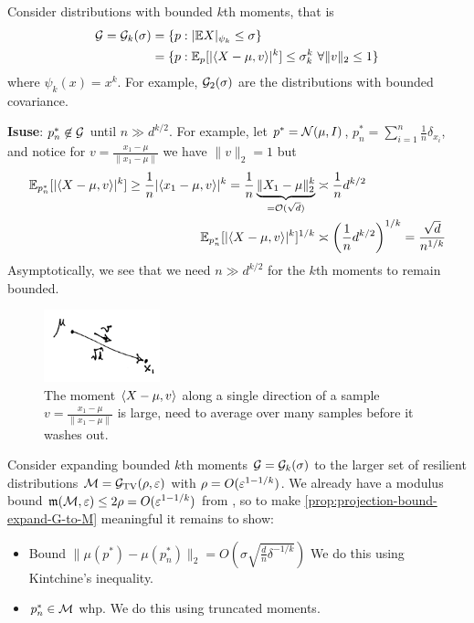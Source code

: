 \begin{example}
  Consider distributions with bounded $k$th moments, that is
  \begin{align}
    \mathcal{G} = \mathcal{G}_k(\sigma)
    &= \{ p : \lvert \mathbb{E} X \rvert_{\psi_k} \leq \sigma \} \\
    &= \{ p : \mathbb{E}_p[ \lvert \braket{X - \mu, v} \rvert^k] \leq \sigma_k^k~\forall \|v\|_2 \leq 1\}
  \end{align}
  where $\psi_k(x) = x^k$.
  For example, $\mathcal{G}_2(\sigma)$ are the distributions with bounded covariance.

  \textbf{Isuse}: $p_n^* \not\in \mathcal{G}$ until $n \gg d^{k/2}$. For example,
  let $p^* = \mathcal{N}(\mu, I)$, $p_n^* = \sum_{i=1}^n \frac{1}{n} \delta_{x_i}$,
  and notice for $v = \frac{x_1 - \mu}{\|x_1 - \mu\|}$
  we have $\|v\|_2 = 1$ but
  \begin{align}
    \mathbb{E}_{p_n^*}[\lvert \braket{X - \mu, v}\rvert^k]
    \geq \frac{1}{n} \lvert \braket{x_1 - \mu, v}\rvert^k
    = \frac{1}{n} \underbrace{\|X_1 - \mu\|_2^k}_{=\mathcal{O}(\sqrt{d})}
    &\asymp \frac{1}{n} d^{k/2} \\
    \mathbb{E}_{p_n^*}[\lvert \braket{X - \mu, v}\rvert^k]^{1/k}
    &\asymp \left( \frac{1}{n} d^{k/2} \right)^{1/k}
    = \frac{\sqrt{d}}{n^{1/k}}
  \end{align}
  Asymptotically, we see that we need $n \gg d^{k/2}$ for the $k$th moments to
  remain bounded.

  \begin{figure}[H]
    \begin{center}
      \includegraphics[width=0.3\textwidth]{figures/9-17-4.png}
    \end{center}
    \caption{The moment $\braket{X - \mu, v}$ along a
      single direction of a sample $v = \frac{x_1 - \mu}{\|x_1 - \mu\|}$
      is large, need to average over many samples before it washes out.}
  \end{figure}
\end{example}

Consider expanding bounded $k$th moments $\mathcal{G} = \mathcal{G}_k(\sigma)$ to the larger
set of resilient distributions $\mathcal{M} = \mathcal{G}_{\operatorname{TV}}(\rho, \varepsilon)$ with $\rho = O(\varepsilon^{1 - 1/k})$.
We already have a modulus bound $\mathfrak{m}(\mathcal{M}, \varepsilon) \leq 2 \rho = O(\varepsilon^{1 - 1/k})$
from , so
to make \cref{prop:projection-bound-expand-G-to-M} meaningful
it remains to show:
\begin{itemize}
  \item Bound 
    $\|\mu(p^*) - \mu(p_n^*)\|_2 = O\left(\sigma \sqrt{\frac{d}{n} \delta^{-1/k}}\right)$
    We do this using Kintchine's inequality.

  \item $p^*_n \in \mathcal{M}$ whp. 
    We do this using truncated moments.
\end{itemize}

